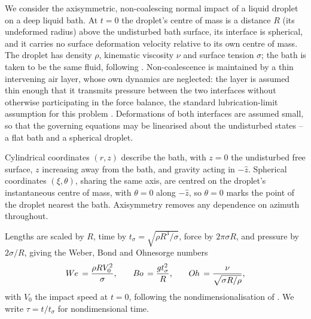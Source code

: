 We consider the axisymmetric, non-coalescing normal impact of a liquid droplet on a deep liquid bath. At $t=0$ the droplet's centre of mass is a distance $R$ (its undeformed radius) above the undisturbed bath surface, its interface is spherical, and it carries no surface deformation velocity relative to its own centre of mass. The droplet has density $\rho$, kinematic viscosity $\nu$ and surface tension $\sigma$; the bath is taken to be the same fluid, following \cite{AlventosaEtAl2023}. Non-coalescence is maintained by a thin intervening air layer, whose own dynamics are neglected: the layer is assumed thin enough that it transmits pressure between the two interfaces without otherwise participating in the force balance, the standard lubrication-limit assumption for this problem \citep{AlventosaEtAl2023,AgueroEtAl2026}. Deformations of both interfaces are assumed small, so that the governing equations may be linearised about the undisturbed states -- a flat bath and a spherical droplet.

Cylindrical coordinates $(r,z)$ describe the bath, with $z=0$ the undisturbed free surface, $z$ increasing away from the bath, and gravity acting in $-\hat z$. Spherical coordinates $(\xi,\theta)$, sharing the same axis, are centred on the droplet's instantaneous centre of mass, with $\theta=0$ along $-\hat z$, so $\theta=0$ marks the point of the droplet nearest the bath. Axisymmetry removes any dependence on azimuth throughout.

Lengths are scaled by $R$, time by $t_\sigma=\sqrt{\rho R^3/\sigma}$, force by $2\pi\sigma R$, and pressure by $2\sigma/R$, giving the Weber, Bond and Ohnesorge numbers
\begin{equation}
    W\kern-0.03em e\,=\frac{\rho R V_0^2}{\sigma}\text{,}\qquad
    B\kern-0.04em o\,=\frac{g t_\sigma^2}{R}\text{,}\qquad
    O\kern-0.04em h\,=\frac{\nu}{\sqrt{\sigma R/\rho}}\text{,}
    \label{eq:nondim}
\end{equation}
with $V_0$ the impact speed at $t=0$, following the nondimensionalisation of \cite{AlventosaEtAl2023}. We write $\tau=t/t_\sigma$ for nondimensional time.

